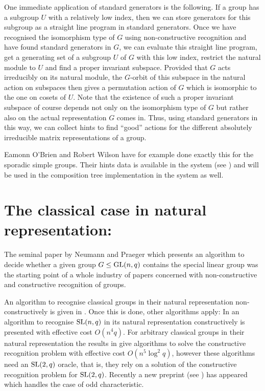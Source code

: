 \begin{App}
\label{hintsstabchains}
%
One immediate application of standard generators is the following. If
a group has a subgroup $U$ with a relatively low index, then we can store
generators for this subgroup as a straight line program in standard
generators. Once we have recognised the isomorphism type of $G$
using non-constructive recognition and have found standard generators
in $G$, we can evaluate this straight line program, get a
generating set of a subgroup $U$ of $G$ with this low index, restrict
the natural module to $U$ and find a proper invariant subspace. Provided
that $G$ acts irreducibly on its natural module, the
$G$-orbit of this subspace in the natural action on subspaces then
gives a permutation action of $G$ which is isomorphic to the one on
cosets of $U$. Note that the existence of such a proper invariant subspace 
of course depends not only on the isomorphism type of $G$ but rather
also on the actual representation $G$ comes in.
Thus, using standard generators in this way, we can collect hints
to find ``good'' actions for the different absolutely irreducible
matrix representations of a group.

Eamonn O'Brien and Robert Wilson have for example done exactly this
for the sporadic simple groups. Their hints data is available in the
{\MAGMA} system (see \cite{Magma}) and will be used in the composition tree
implementation in the {\GAP} system as well.
\end{App}
% 

\section{The classical case in natural representation: }
\label{solveD8}

The seminal paper by Neumann and Praeger \cite{neumann-praeger} which
presents an algorithm to decide whether a given group $G \le \GL(n,q)$
contains the special linear group was the starting point of a whole
industry of papers concerned with non-constructive and constructive
recognition of groups.

An algorithm to recognise classical groups in their
natural representation non-constructively is given in
\cite{classicalnonconstructive}. Once this is done, other algorithms
apply: In \cite{slrecogconstr} an algorithm to recognise $\SL(n,q)$
in its natural representation constructively is presented with
effective cost $O(n^4q)$. For arbitrary classical groups in their
natural representation the results in \cite{peteconstructiveclassical}
give algorithms to solve the constructive recognition problem with
effective cost $O(n^5 \log^2 q)$, however these algorithms need an
$\SL(2,q)$ oracle, that is, they rely on a solution of the constructive
recognition problem for $\SL(2,q)$. Recently a new preprint (see
\cite{recogclassicalodd}) has appeared which handles the case of odd
characteristic.

